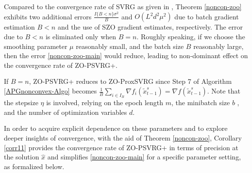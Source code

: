 \documentclass{article}
\theoremstyle{definition}
\theoremstyle{remark}
\begin{document}
{\color{Brown}
Compared to the convergence rate of SVRG as given in \cite{reddi2016proximal}, Theorem \ref{noncon-zoo} exhibits two
additional errors $\frac{I\{B < n\}\sigma ^2}{B}$ and $O(L^2d^2\mu^2)$ due to batch gradient estimation $B < n$ and the use of SZO gradient estimates, respectively. The error due to $B < n$ is eliminated only when $B = n$. Roughly
speaking, if we choose the smoothing parameter $\mu$ reasonably small, and the batch size $B$ reasonably large, then the error \eqref{noncon-zoo-main}
would reduce, leading to non-dominant effect on the convergence rate of ZO-PSVRG+. 

{\color{Brown}
If $B = n$, ZO-PSVRG+ reduces to ZO-ProxSVRG  since Step 7 of Algorithm \ref{APGnonconvex-Algo} becomes
$\frac{1}{B}\sum_{i\in I_B} \nabla f_i(\tilde{x}^s_{t-1}) = \nabla f(\tilde{x}^s_{t-1})$. }
Note that the stepsize  $\eta$ is involved, relying on the epoch length $m$, the minibatch size $b$ , and the number of optimization variables $d$. 
}

{\color{Brown}
In order to acquire explicit dependence on these parameters and to explore deeper insights of convergence, with the aid of Theorem \ref{noncon-zoo}, Corollary \ref{corr11} provides the convergence rate of ZO-PSVRG+ in terms of precision at the solution $\hat{x}$ and  simplifies \eqref{noncon-zoo-main} for a specific parameter setting, as formalized below.
}
\end{document}
